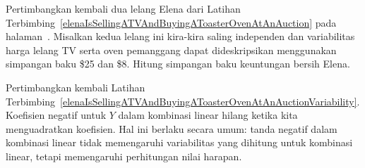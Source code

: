 \begin{exercisewrap}
\begin{nexercise}\label{elenaIsSellingATVAndBuyingAToasterOvenAtAnAuctionVariability}
Pertimbangkan kembali dua lelang Elena dari Latihan Terbimbing~\ref{elenaIsSellingATVAndBuyingAToasterOvenAtAnAuction} pada halaman~\pageref{elenaIsSellingATVAndBuyingAToasterOvenAtAnAuction}. Misalkan kedua lelang ini kira-kira saling independen dan variabilitas harga lelang TV serta oven pemanggang dapat dideskripsikan menggunakan simpangan baku \$25 dan \$8. Hitung simpangan baku keuntungan bersih Elena.\footnotemark
\end{nexercise}
\end{exercisewrap}

Pertimbangkan kembali Latihan Terbimbing~\ref{elenaIsSellingATVAndBuyingAToasterOvenAtAnAuctionVariability}. Koefisien negatif untuk $Y$ dalam kombinasi linear hilang ketika kita menguadratkan koefisien. Hal ini berlaku secara umum: tanda negatif dalam kombinasi linear tidak memengaruhi variabilitas yang dihitung untuk kombinasi linear, tetapi memengaruhi perhitungan nilai harapan.



{}
